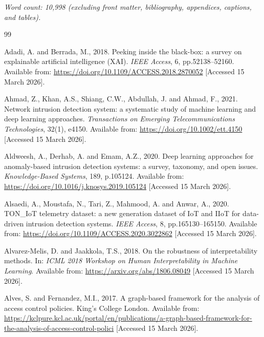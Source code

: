 \documentclass[12pt,a4paper]{report}
\begin{document}
\vspace{1em}
\noindent\textit{Word count: 10,998 (excluding front matter, bibliography, appendices, captions, and tables).}


\begin{thebibliography}{99}

Adadi, A. and Berrada, M., 2018. Peeking inside the black-box: a survey on explainable artificial intelligence (XAI). \textit{IEEE Access}, 6, pp.52138--52160. Available from: \url{https://doi.org/10.1109/ACCESS.2018.2870052} [Accessed 15 March 2026].

Ahmad, Z., Khan, A.S., Shiang, C.W., Abdullah, J. and Ahmad, F., 2021. Network intrusion detection system: a systematic study of machine learning and deep learning approaches. \textit{Transactions on Emerging Telecommunications Technologies}, 32(1), e4150. Available from: \url{https://doi.org/10.1002/ett.4150} [Accessed 15 March 2026].

Aldweesh, A., Derhab, A. and Emam, A.Z., 2020. Deep learning approaches for anomaly-based intrusion detection systems: a survey, taxonomy, and open issues. \textit{Knowledge-Based Systems}, 189, p.105124. Available from: \url{https://doi.org/10.1016/j.knosys.2019.105124} [Accessed 15 March 2026].

Alsaedi, A., Moustafa, N., Tari, Z., Mahmood, A. and Anwar, A., 2020. TON\_IoT telemetry dataset: a new generation dataset of IoT and IIoT for data-driven intrusion detection systems. \textit{IEEE Access}, 8, pp.165130--165150. Available from: \url{https://doi.org/10.1109/ACCESS.2020.3022862} [Accessed 15 March 2026].

Alvarez-Melis, D. and Jaakkola, T.S., 2018. On the robustness of interpretability methods. In: \textit{ICML 2018 Workshop on Human Interpretability in Machine Learning}. Available from: \url{https://arxiv.org/abs/1806.08049} [Accessed 15 March 2026].

Alves, S. and Fernandez, M.I., 2017. A graph-based framework for the analysis of access control policies. King's College London. Available from: \url{https://kclpure.kcl.ac.uk/portal/en/publications/a-graph-based-framework-for-the-analysis-of-access-control-polici} [Accessed 15 March 2026].


\end{thebibliography}
\end{document}
